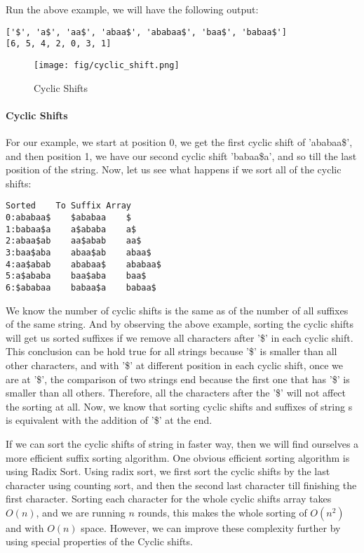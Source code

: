 \documentclass[../main.tex]{subfiles}
\begin{document}
Run the above example, we will have the following output:
\begin{lstlisting}[numbers=none]
['$', 'a$', 'aa$', 'abaa$', 'ababaa$', 'baa$', 'babaa$']
[6, 5, 4, 2, 0, 3, 1]
\end{lstlisting}

\begin{figure}[h]
    \centering
    \texttt{[image: fig/cyclic\_shift.png]}
    \caption{Cyclic Shifts}
    \label{fig:clyclic_shifts}
\end{figure}
\paragraph{Cyclic Shifts} For our example, we start at position 0, we get the first cyclic shift of 'ababaa\$', and then position 1, we have our second cyclic shift 'babaa\$a', and so till the last position of the string. Now, let us see what happens if we sort all of the cyclic shifts:
\begin{lstlisting}[numbers=none]
             Sorted    To Suffix Array
0:ababaa$    $ababaa    $
1:babaa$a    a$ababa    a$
2:abaa$ab    aa$abab    aa$
3:baa$aba    abaa$ab    abaa$
4:aa$abab    ababaa$    ababaa$
5:a$ababa    baa$aba    baa$
6:$ababaa    babaa$a    babaa$
\end{lstlisting}

We know the number of cyclic shifts is the same as of the number of all suffixes of the same string. And by observing the above example, sorting the cyclic shifts will get us sorted suffixes if we remove all characters after '\$' in each cyclic shift. This conclusion can be hold true for all strings because '\$' is smaller than all other characters, and with '\$' at different position in each cyclic shift, once we are at '\$', the comparison of two strings end because the first one that has '\$' is smaller than all others. Therefore, all the characters after the '\$' will not affect the sorting at all. Now, we know that sorting cyclic shifts and suffixes of string s is equivalent with the addition of '\$' at the end. 

If we can sort the cyclic shifts of string in faster way, then we will find ourselves a more efficient suffix sorting algorithm. One obvious efficient sorting algorithm is using Radix Sort. Using radix sort, we first sort the cyclic shifts by the last character using counting sort, and then the second last character till finishing the first character. Sorting each character for the whole cyclic shifts array takes $O(n)$, and we are running $n$ rounds, this makes the whole sorting of $O(n^2)$ and with $O(n)$ space. However, we can improve these complexity further by using special properties of the Cyclic shifts. %
\end{document}
